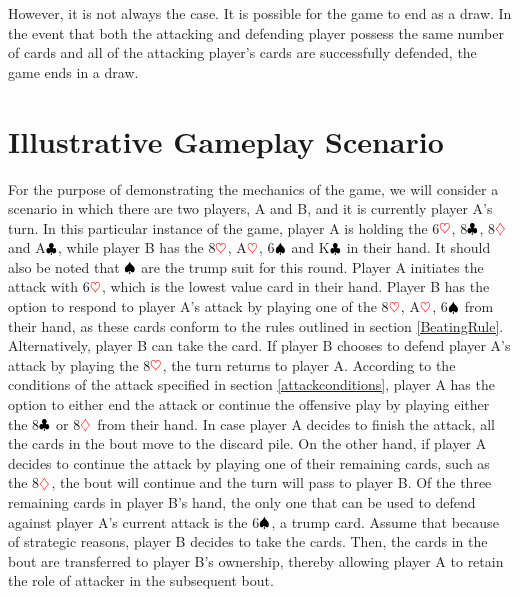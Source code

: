 However, it is not always the case. It is possible for the game to end as a draw. In the event that both the attacking and defending player possess the same number of cards and all of the attacking player's cards are successfully defended, the game ends in a draw.

\section{Illustrative Gameplay Scenario}
\label{illustration}
For the purpose of demonstrating the mechanics of the game, we will consider a scenario in which there are two players, A and B, and it is currently player A's turn. In this particular instance of the game, player A is holding the 6$\textcolor{red}{\heartsuit}$, 8$\textcolor{black}{\clubsuit}$, 8$\textcolor{red}{\diamondsuit}$ and A$\textcolor{black}{\clubsuit}$, while player B has the 8$\textcolor{red}{\heartsuit}$, A$\textcolor{red}{\heartsuit}$, 6$\textcolor{black}{\spadesuit}$ and K$\textcolor{black}{\clubsuit}$ in their hand. It should also be noted that $\textcolor{black}{\spadesuit}$ are the trump suit for this round. Player A initiates the attack with 6$\textcolor{red}{\heartsuit}$, which is the lowest value card in their hand. Player B has the option to respond to player A's attack by playing one of the 8$\textcolor{red}{\heartsuit}$, A$\textcolor{red}{\heartsuit}$, 6$\textcolor{black}{\spadesuit}$ from their hand, as these cards conform to the rules outlined in section \ref{BeatingRule}. Alternatively, player B can take the card. If player B chooses to defend player A's attack by playing the 8$\textcolor{red}{\heartsuit}$, the turn returns to player A. According to the conditions of the attack specified in section \ref{attackconditions}, player A has the option to either end the attack or continue the offensive play by playing either the 8$\textcolor{black}{\clubsuit}$ or 8$\textcolor{red}{\diamondsuit}$ from their hand. In case player A decides to finish the attack, all the cards in the bout move to the discard pile. On the other hand, if player A decides to continue the attack by playing one of their remaining cards, such as the 8$\textcolor{red}{\diamondsuit}$, the bout will continue and the turn will pass to player B. Of the three remaining cards in player B's hand, the only one that can be used to defend against player A's current attack is the 6$\textcolor{black}{\spadesuit}$, a trump card. Assume that because of strategic reasons, player B decides to take the cards. Then, the cards in the bout are transferred to player B's ownership, thereby allowing player A to retain the role of attacker in the subsequent bout.
